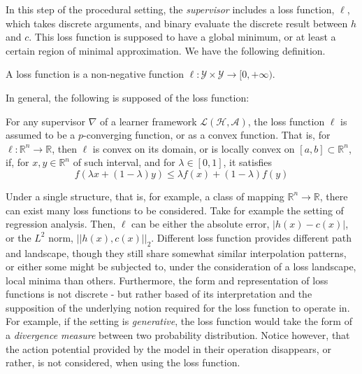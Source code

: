 In this step of the procedural setting, the \textit{supervisor} includes a loss function, $\ell$, which takes discrete arguments, and binary evaluate the discrete result between $h$ and $c$. This loss function is supposed to have a global minimum, or at least a certain region of minimal approximation. We have the following definition. 
\begin{definition}
    A loss function is a non-negative function $\ell :\mathcal{Y}\times\mathcal{Y}\to [0,+\infty)$. 
\end{definition}

In general, the following is supposed of the loss function: 
\begin{conjecture}
    For any supervisor $\nabla$ of a learner framework $\mathcal{L}(\mathcal{H},\mathcal{A})$, the loss function $\ell$ is assumed to be a $p$-converging function, or as a convex function. That is, for $\ell: \mathbb{R}^{n}\to \mathbb{R}$, then $\ell$ is convex on its domain, or is locally convex on $[a,b]\subset \mathbb{R}^{n}$, if, for $x,y\in\mathbb{R}^{n}$ of such interval, and for $\lambda \in [0,1]$, it satisfies 
    \begin{equation}
        f(\lambda x + (1-\lambda)y) \leq \lambda f(x) + (1-\lambda) f(y)
    \end{equation}
\end{conjecture}

Under a single structure, that is, for example, a class of mapping $\mathbb{R}^{n}\to\mathbb{R}$, there can exist many loss functions to be considered. Take for example the setting of regression analysis. Then, $\ell$ can be either the absolute error, $\lvert h(x)-c(x)\rvert$, or the $L^{2}$ norm, $\lvert\lvert h(x), c(x)\rvert\rvert_{2}$. Different loss function provides different path and landscape, though they still share somewhat similar interpolation patterns, or either some might be subjected to, under the consideration of a loss landscape, local minima than others. Furthermore, the form and representation of loss functions is not discrete - but rather based of its interpretation and the supposition of the underlying notion required for the loss function to operate in. For example, if the setting is \textit{generative}, the loss function would take the form of a \textit{divergence measure} between two probability distribution. Notice however, that the action potential provided by the model in their operation disappears, or rather, is not considered, when using the loss function. 

